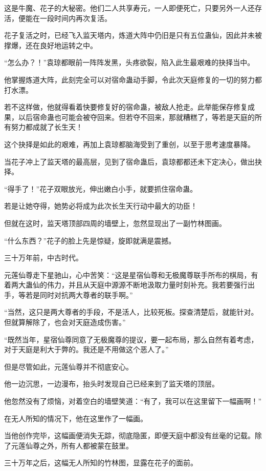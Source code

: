 \begin{this_body}
这是牛魔、花子的大秘密。他们二人共享寿元，一人即便死亡，只要另外一人还存活，便能在一段时间内再次复活。

花子复活之时，已经飞入监天塔内，炼道大阵中仍旧是只有五位蛊仙，因此并未被撑爆，还在良好地运转之中。

“怎么办？！”袁琼都眼前一阵阵发黑，头疼欲裂，陷入此生最艰难的抉择当中。

他掌握炼道大阵，此刻完全可以对宿命蛊动手脚，令此次天庭修复的一切的努力都打水漂。

若不这样做，他就得看着快要修复好的宿命蛊，被敌人抢走。此举能保存修复成果，以后宿命蛊也可能会被夺回来。但若夺不回来，那就糟糕了，等若是天庭的所有努力都成就了长生天！

这个抉择是如此的艰难，再加上袁琼都脑海受到了重创，以至于思考速度暴降。

当花子冲上了监天塔的最高层，见到了宿命蛊后，袁琼都都还未下定决心，做出抉择。

“得手了！”花子双眼放光，伸出嫩白小手，就要抓住宿命蛊。

若是让她夺得，她势必将成为此次长生天行动中最大的功臣！

但就在这时，监天塔顶部四周的墙壁上，忽然显现出了一副竹林图画。

“什么东西？”花子的脸上先是惊疑，旋即就满是震撼。

三十万年前，中古时代。

元莲仙尊走下星驰山，心中苦笑：“这是星宿仙尊和无极魔尊联手所布的棋局，有着两大蛊仙的伟力，并且从天庭中源源不断地汲取力量时刻补充。我若要强行出手，等若是同时对抗两大尊者的联手啊。”

“当然，这只是两大尊者的手段，不是活人，比较死板。探查清楚后，就能针对。但就算解除了，也会对天庭造成伤害。”

“既然当年，星宿仙尊同意了无极魔尊的提议，要一起布局，那么自然有着考虑，对于天庭是利大于弊的。我还是不用做这个恶人了。”

但是尽管如此，元莲仙尊并不彻底安心。

他一边沉思，一边漫布，抬头时发现自己已经来到了监天塔的顶层。

他忽然没有了烦恼，对着空白的墙壁笑道：“有了，我可以在这里留下一幅画啊！”

在无人所知的情况下，他在这里作了一幅画。

当他创作完毕，这幅画便消失无踪，彻底隐匿，即便天庭中都没有丝毫的记载。除了元莲仙尊之外，所有人都被蒙在鼓里。

三十万年之后，这幅无人所知的竹林图，显露在花子的面前。


\end{this_body}

